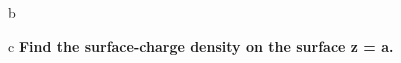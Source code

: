 \begin{homeworkProblem}
\begin{homeworkSection}{b}
\end{homeworkSection}

\begin{homeworkSection}{c}
\textbf{Find the surface-charge density on the surface z = a.}
\end{homeworkSection}

\end{homeworkProblem}